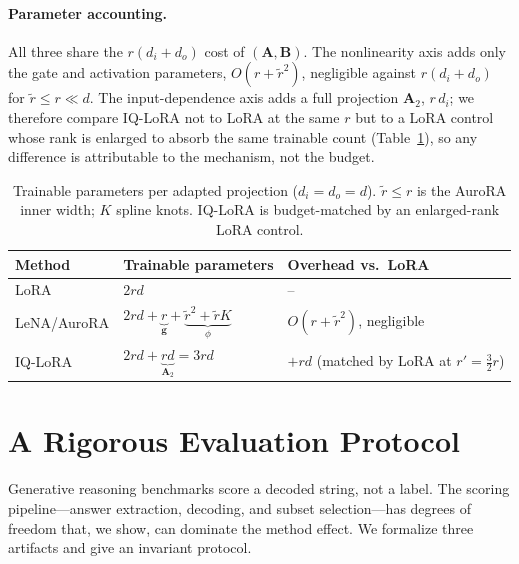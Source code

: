 \documentclass[preprint,11pt]{elsarticle}
\newcommand{\A}{\bm{A}}
\newcommand{\B}{\bm{B}}
\newcommand{\g}{\bm{g}}
\begin{document}
\paragraph{Parameter accounting.} All three share the $r(d_i+d_o)$ cost of $(\A,\B)$. The nonlinearity axis adds only the
gate and activation parameters, $O(r+\tilde r^2)$, negligible against $r(d_i+d_o)$ for $\tilde r\le r\ll d$. The
input-dependence axis adds a full projection $\A_2$, $r\,d_i$; we therefore compare IQ-LoRA not to LoRA at the same $r$ but
to a LoRA control whose rank is enlarged to absorb the same trainable count (Table~\ref{tab:params}), so any difference is
attributable to the mechanism, not the budget.
\begin{table}[t]\centering
\caption{Trainable parameters per adapted projection ($d_i{=}d_o{=}d$). $\tilde r\!\le\! r$ is the AuroRA inner width;
$K$ spline knots. IQ-LoRA is budget-matched by an enlarged-rank LoRA control.}
\label{tab:params}
\begin{tabular}{lll}
\toprule
Method & Trainable parameters & Overhead vs.\ LoRA\\
\midrule
LoRA          & $2rd$ & --\\
LeNA/AuroRA   & $2rd+\underbrace{r}_{\g}+\underbrace{\tilde r^2+\tilde rK}_{\phi}$ & $O(r+\tilde r^2)$, negligible\\
IQ-LoRA       & $2rd+\underbrace{rd}_{\A_2}=3rd$ & $+rd$ (matched by LoRA at $r'{=}\tfrac{3}{2}r$)\\
\bottomrule
\end{tabular}
\end{table}

\section{A Rigorous Evaluation Protocol}
\label{sec:protocol}
Generative reasoning benchmarks score a decoded string, not a label. The scoring pipeline---answer extraction, decoding,
and subset selection---has degrees of freedom that, we show, can dominate the method effect. We formalize three artifacts
and give an invariant protocol.
\end{document}
